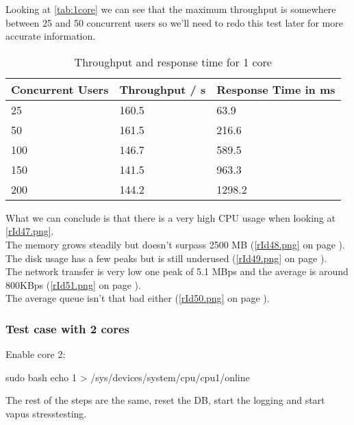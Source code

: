 Looking at \autoref{tab:1core} we can see that the maximum throughput is somewhere between 25 and 50 concurrent users so we'll need to redo this test later for more accurate information.
\begin{table}[ht!]
\begin{center}
\caption{Throughput and response time for 1 core}
\label{tab:1core}
\begin{tabular}[ht!]{|p{2.2cm}|p{2.2cm}|p{2.2cm}|}\hline\rowcolor{myLightGreen}\arrayrulecolor{myLightGreen}
 {\bf\color{white} Concurrent Users} & {\bf\color{white} Throughput / s} & {\bf\color{white} Response Time in ms} \\ \hline 
 25 & 160.5 & 63.9 \\ \hline  \rowcolor{rowhighlight} 
 50 & 161.5 & 216.6 \\ \hline 
 100 & 146.7 & 589.5 \\ \hline 
 150 & 141.5 & 963.3 \\ \hline 
 200 & 144.2 & 1298.2 \\ \hline 
\end{tabular}
\end{center}
\end{table}
What we can conclude is that there is a very high CPU usage when looking at \autoref{rId47.png}. 
\\The memory grows steadily but doesn't surpass 2500 MB (\autoref{rId48.png} on page \pageref{rId48.png}).
\\The disk usage has a few peaks but is still underused (\autoref{rId49.png} on page \pageref{rId49.png}). 
\\The network transfer is very low one peak of 5.1 MBps and the average is around 800KBps (\autoref{rId51.png} on page \pageref{rId51.png}).
\\The average queue isn't that bad either (\autoref{rId50.png} on page \pageref{rId50.png}).

\clearpage{}%

\subsubsection{Test case with 2 cores}
Enable core 2:
\begin{codelisting}
sudo bash
echo 1 > /sys/devices/system/cpu/cpu1/online
\end{codelisting}
The rest of the steps are the same, reset the DB, start the logging and start \gls{vapus} stresstesting.

